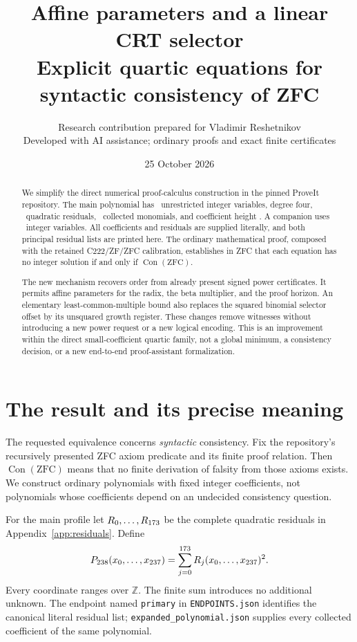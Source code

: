 \documentclass[11pt]{article}
\title{Affine parameters and a linear CRT selector\\[3pt]
\large Explicit quartic equations for syntactic consistency of ZFC}
\author{Research contribution prepared for Vladimir Reshetnikov\\
\small Developed with AI assistance; ordinary proofs and exact finite certificates}
\date{25 October 2026}
\theoremstyle{remark}\newtheorem{remark}[theorem]{Remark}
\newcommand{\Z}{\mathbb Z}\newcommand{\N}{\mathbb N}
\newcommand{\Con}{\operatorname{Con}}
\begin{document}
\maketitle
\begin{abstract}
We simplify the direct numerical proof-calculus construction in the pinned
ProveIt repository. The main polynomial has \PrimaryVars\ unrestricted
integer variables, degree four, \PrimaryRows\ quadratic residuals,
\PrimaryTerms\ collected monomials, and coefficient height \PrimaryHeight.
A companion uses \SmallVars\ integer variables. All coefficients and
residuals are supplied literally, and both principal residual lists are printed here.
The ordinary mathematical proof, composed with the retained C222/ZF/ZFC
calibration, establishes in ZFC that each equation has no integer solution
if and only if $\Con(\mathrm{ZFC})$.

The new mechanism recovers order from already present signed power
certificates. It permits affine parameters for the radix, the beta
multiplier, and the proof horizon. An elementary
least-common-multiple bound also replaces the squared binomial selector
offset by its unsquared growth register. These changes remove witnesses
without introducing a new power request or a new logical encoding.
This is an improvement within the direct small-coefficient quartic family,
not a global minimum, a consistency decision, or a new end-to-end
proof-assistant formalization.
\end{abstract}
\begingroup\small\setcounter{tocdepth}{1}
\setlength{\parskip}{0pt}\tableofcontents
\endgroup
\newpage

\section{The result and its precise meaning}

The requested equivalence concerns \emph{syntactic} consistency. Fix the
repository's recursively presented ZFC axiom predicate and its finite
proof relation. Then $\Con(\mathrm{ZFC})$ means that no finite derivation
of falsity from those axioms exists. We construct ordinary polynomials
with fixed integer coefficients, not polynomials whose coefficients
depend on an undecided consistency question.

For the main profile let $R_0,\ldots,R_{173}$ be the complete
quadratic residuals in Appendix~\ref{app:residuals}. Define
\begin{equation}\label{eq:main}
 P_{238}(x_0,\ldots,x_{237})
   =\sum_{j=0}^{173}R_j(x_0,\ldots,x_{237})^2.
\end{equation}
Every coordinate ranges over $\Z$. The finite sum introduces no additional
unknown. The endpoint named \texttt{primary} in \texttt{ENDPOINTS.json} identifies the canonical
literal residual list; \texttt{expanded\_polynomial.json} supplies every
collected coefficient of the same polynomial.
\end{document}
